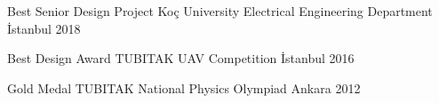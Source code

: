 \begin{cvhonors}

  \cvhonor
    {Best Senior Design Project} %
    {Koç University Electrical Engineering Department} %
    {İstanbul} %
    {2018} %
    
    
  \cvhonor
    {Best Design Award} %
    {TUBITAK UAV Competition} %
    {İstanbul} %
    {2016} %
    



    
  \cvhonor
    {Gold Medal} %
    {TUBITAK National Physics Olympiad} %
    {Ankara} %
    {2012} %

\end{cvhonors}
